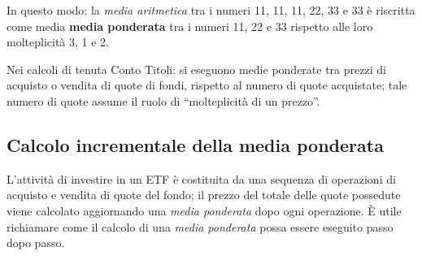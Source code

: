 \documentclass[12pt,a4paper]{article}
\begin{document}
In questo modo: la \emph{media aritmetica} tra i numeri \num{11}, \num{11}, \num{11},
\num{22}, \num{33} e  \num{33} è riscritta come media \textbf{media  ponderata} tra i
numeri \num{11}, \num{22} e \num{33} rispetto alle loro molteplicità \num{3}, \num{1}
e \num{2}.

Nei  calcoli di  tenuta  Conto Titoli:  si  eseguono medie  ponderate  tra prezzi  di
acquisto o vendita  di quote di fondi,  rispetto al numero di  quote acquistate; tale
numero di quote assume il ruolo di ``molteplicità di un prezzo''.

\subsection{Calcolo incrementale della media ponderata}


L'attività di  investire in  un ETF  è costituita  da una  sequenza di  operazioni di
acquisto e  vendita di quote  del fondo; il prezzo  del totale delle  quote possedute
viene calcolato aggiornando una \emph{media ponderata} dopo ogni operazione.  È utile
richiamare come il calcolo di una  \emph{media ponderata} possa essere eseguito passo
dopo passo.
\end{document}
